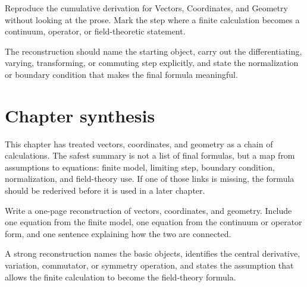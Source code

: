 \begin{exercise}
Reproduce the cumulative derivation for Vectors, Coordinates, and Geometry without looking at the prose.  Mark the step where a finite calculation becomes a continuum, operator, or field-theoretic statement.
\begin{answer}
The reconstruction should name the starting object, carry out the differentiating, varying, transforming, or commuting step explicitly, and state the normalization or boundary condition that makes the final formula meaningful.
\end{answer}
\end{exercise}



\section{Chapter synthesis}

This chapter has treated vectors, coordinates, and geometry as a chain of calculations.  The safest summary is not a list of final formulas, but a map from assumptions to equations: finite model, limiting step, boundary condition, normalization, and field-theory use.  If one of those links is missing, the formula should be rederived before it is used in a later chapter.

\begin{exercise}
Write a one-page reconstruction of vectors, coordinates, and geometry.  Include one equation from the finite model, one equation from the continuum or operator form, and one sentence explaining how the two are connected.
\begin{answer}
A strong reconstruction names the basic objects, identifies the central derivative, variation, commutator, or symmetry operation, and states the assumption that allows the finite calculation to become the field-theory formula.
\end{answer}
\end{exercise}
